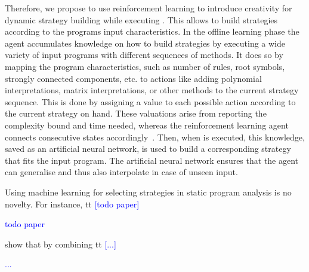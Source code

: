 \documentclass[envcountsame]{llncs}
\newcommand\MS[2][r]{\ifx t#1 \textcolor{blue}{[#2]}%
\else \begin{center}\textcolor{blue}{#2} \end{center} \fi}%
\begin{document}
Therefore, we propose to use reinforcement learning to introduce creativity for dynamic strategy
building while executing \tct{}. This allows to build strategies according to the programs input
characteristics.
%
In the offline learning phase the agent accumulates knowledge on how to build strategies by
executing a wide variety of input programs with different sequences of methods. It does so by
mapping the program characteristics, such as number of rules, root symbols, strongly connected
components, etc\@. to actions like adding polynomial interpretations, matrix interpretations, or
other methods to the current strategy sequence. This is done by assigning a value to each possible
action according to the current strategy on hand. These valuations arise from reporting the
complexity bound and time needed, whereas the reinforcement learning agent connects consecutive
states accordingly~\cite{sutton1998introduction}.
%
Then, when \tct{} is executed, this knowledge, saved as an artificial neural network, is used to
build a corresponding strategy that fits the input program. The artificial neural network ensures
that the agent can generalise and thus also interpolate in case of unseen input.

%


Using machine learning for selecting strategies in static program analysis is no novelty. For
instance, \MS[t]{todo paper} show that by combining \MS[t]{...}


\end{document}
